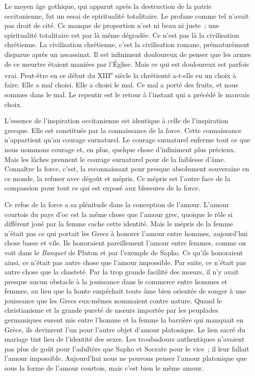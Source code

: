 \documentclass[french,twoside]{book} %
\begin{document}
Le moyen âge gothique, qui apparut après la destruction de la patrie occitanienne, fut un essai de spiritualité totalitaire. Le profane comme tel n'avait pas droit de cité. Ce manque de proportion n'est ni beau ni juste ; une spiritualité totalitaire est par là même dégradée. Ce n'est pas là la civilisation chrétienne. La civilisation chrétienne, c'est la civilisation romane, prématuré­ment disparue après un assassinat. Il est infiniment douloureux de penser que les armes de ce meurtre étaient maniées par l'Église. Mais ce qui est doulou­reux est parfois vrai. Peut-être en ce début du XIII\textsuperscript{e} siècle la chrétienté a-t-elle eu un choix à faire. Elle a mal choisi. Elle a choisi le mal. Ce mal a porté des fruits, et nous sommes dans le mal. Le repentir est le retour à l'instant qui a précédé le mauvais choix.\par
L'essence de l'inspiration occitanienne est identique à celle de l'inspiration grecque. Elle est constituée par la connaissance de la force. Cette connais­sance n'appartient qu'au courage surnaturel. Le courage surnaturel enferme tout ce que nous nommons courage et, en plus, quelque chose d'infiniment plus précieux. Mais les lâches prennent le courage surnaturel pour de la faiblesse d'âme. Connaître la force, c'est, la reconnaissant pour presque abso­lument souveraine en ce monde, la refuser avec dégoût et mépris. Ce mépris est l'autre face de la compassion pour tout ce qui est exposé aux blessures de la force.\par
Ce refus de la force a sa plénitude dans la conception de l'amour. L'amour courtois du pays d'oc est la même chose que l'amour grec, quoique le rôle si différent joué par la femme cache cette identité. Mais le mépris de la femme n'était pas ce qui portait les Grecs à honorer l'amour entre hommes, aujour­d'hui chose basse et vile. Ils honoraient pareillement l'amour entre femmes, comme on voit dans le {\itshape Banquet} de Pluton et par l'exemple de Sapho. Ce qu'ils honoraient ainsi, ce n'était pas autre chose que l'amour impossible. Par suite, ce n'était pas autre chose que la chasteté. Par la trop grande facilité des mœurs, il n'y avait presque aucun obstacle à la jouissance dans le commerce entre hommes et femmes, au lieu que la honte empêchait toute âme bien orientée de songer à une jouissance que les Grecs eux-mêmes nommaient contre nature. Quand le christianisme et la grande pureté de mœurs importée par les peuplades germaniques eurent mis entre l'homme et la femme la barrière qui manquait en Grèce, ils devinrent l'un pour l'autre objet d'amour platonique. Le lien sacré du mariage tint lieu de l'identité des sexes. Les troubadours authen­tiques n'avaient pas plus de goût pour l'adultère que Sapho et Socrate pour le vice ; il leur fallait l'amour impossible. Aujourd'hui nous ne pouvons penser l'amour platonique que sous la forme de l'amour courtois, mais c'est bien le même amour.\par
\end{document}
